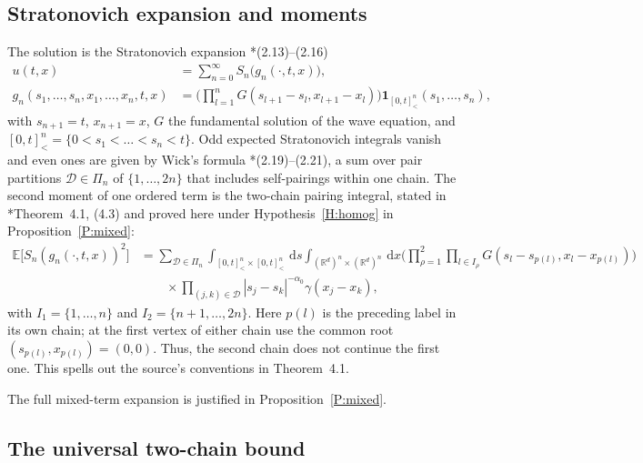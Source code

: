 \documentclass[12pt]{article}
\numberwithin{equation}{section}
\theoremstyle{definition}
\newcommand{\R}{\mathbb{R}}
\newcommand{\E}{\mathbb{E}}
\newcommand{\ud}{\,\mathrm{d}}
\begin{document}
\subsection{Stratonovich expansion and moments}

The solution is the Stratonovich expansion
\cite{chen:author2026:time-dependency}*{(2.13)--(2.16)}
\begin{equation}\label{E:expansion}
  \begin{split}
    u(t,x)&=\sum_{n=0}^\infty S_n\big(g_n(\cdot,t,x)\big),\\
    g_n(s_1,\dots,s_n,x_1,\dots,x_n,t,x)
    &=\Big(\prod_{l=1}^nG(s_{l+1}-s_l,x_{l+1}-x_l)\Big)
    \mathbf 1_{[0,t]^n_<}(s_1,\dots,s_n),
  \end{split}
\end{equation}
with $s_{n+1}=t$, $x_{n+1}=x$, $G$ the fundamental solution of the wave
equation, and $[0,t]^n_<=\{0<s_1<\dots<s_n<t\}$. Odd expected Stratonovich
integrals vanish and even ones are given by Wick's formula
\cite{chen:author2026:time-dependency}*{(2.19)--(2.21)}, a sum over pair
partitions $\mathcal D\in\Pi_n$ of $\{1,\dots,2n\}$ that includes
self-pairings within one chain. The second moment of one ordered term is
the two-chain pairing integral, stated in
\cite{chen:author2026:time-dependency}*{Theorem~4.1, (4.3)} and proved
here under Hypothesis~\ref{H:homog} in Proposition~\ref{P:mixed}:
\begin{equation}\label{E:Sn2}
  \begin{split}
    \E\big[S_n(g_n(\cdot,t,x))^2\big]
    &=\sum_{\mathcal D\in\Pi_n}\int_{[0,t]^n_<\times[0,t]^n_<}\ud s
    \int_{(\R^d)^n\times(\R^d)^n}\ud x
    \Big(\prod_{\rho=1}^2\prod_{l\in I_\rho}
    G(s_l-s_{p(l)},x_l-x_{p(l)})\Big)\\
    &\qquad\times\prod_{(j,k)\in\mathcal D}|s_j-s_k|^{-\alpha_0}\gamma(x_j-x_k),
  \end{split}
\end{equation}
with $I_1=\{1,\dots,n\}$ and $I_2=\{n+1,\dots,2n\}$.
Here $p(l)$ is the preceding label in its own chain; at the first vertex
of either chain use the common root $(s_{p(l)},x_{p(l)})=(0,0)$.
Thus, the second chain does not continue the first one. This spells out
the source's conventions in Theorem~4.1.

The full mixed-term expansion is justified in Proposition~\ref{P:mixed}.

\subsection{The universal two-chain bound}
\end{document}
